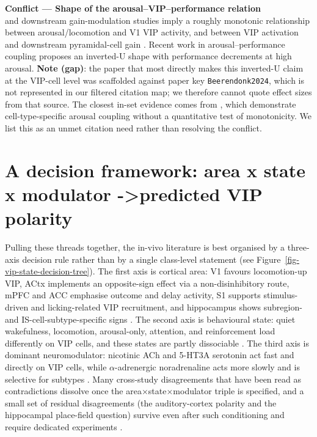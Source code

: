\documentclass[11pt]{article}
\begin{document}
\begin{framed}
\textbf{Conflict --- Shape of the arousal--VIP--performance relation}\\
\citet{Fu2014} and downstream gain-modulation studies imply a roughly monotonic relationship between arousal/locomotion and V1 VIP activity, and between VIP activation and downstream pyramidal-cell gain \citep{Dipoppa2018, Veit2023}. Recent work in arousal--performance coupling proposes an inverted-U shape with performance decrements at high arousal. \textbf{Note (gap)}: the paper that most directly makes this inverted-U claim at the VIP-cell level was scaffolded against paper key \texttt{Beerendonk2024}, which is not represented in our filtered citation map; we therefore cannot quote effect sizes from that source. The closest in-set evidence comes from \citep{Reimer2014, Garciajuncoclemente2017, Munoz2017, Collins2023}, which demonstrate cell-type-specific arousal coupling without a quantitative test of monotonicity. We list this as an unmet citation need rather than resolving the conflict.
\end{framed}

\section{A decision framework: area x state x modulator -\textgreater  predicted VIP polarity}

Pulling these threads together, the in-vivo literature is best organised by a three-axis decision rule rather than by a single class-level statement (see Figure~\ref{fig-vip-state-decision-tree}). The first axis is cortical area: V1 favours locomotion-up VIP, ACtx implements an opposite-sign effect via a non-disinhibitory route, mPFC and ACC emphasise outcome and delay activity, S1 supports stimulus-driven and licking-related VIP recruitment, and hippocampus shows subregion- and IS-cell-subtype-specific signs \citep{Fu2014, Bigelow2019, Yavorska2021, Pinto2015, Yu2019, Lenkey2025}. The second axis is behavioural state: quiet wakefulness, locomotion, arousal-only, attention, and reinforcement load differently on VIP cells, and these states are partly dissociable \citep{Reimer2014, Garciajuncoclemente2017, Pi2013, Szadai2022}. The third axis is dominant neuromodulator: nicotinic ACh and 5-HT3A serotonin act fast and directly on VIP cells, while $\alpha$-adrenergic noradrenaline acts more slowly and is selective for subtypes \citep{Letzkus2011, Ferezou2002, Lee2010, Kawaguchi1998, Lecrux2016}. Many cross-study disagreements that have been read as contradictions dissolve once the area$\times$state$\times$modulator triple is specified, and a small set of residual disagreements (the auditory-cortex polarity and the hippocampal place-field question) survive even after such conditioning and require dedicated experiments \citep{Bigelow2019, Yavorska2021, Lenkey2025, Francavilla2018a}.
\end{document}
